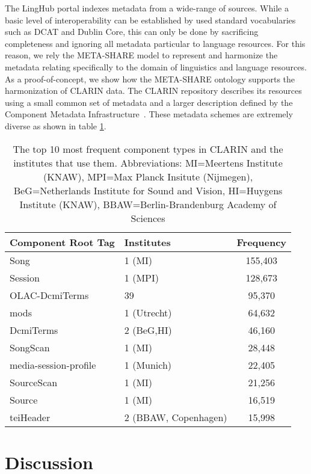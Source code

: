 \documentclass{llncs}
\begin{document}
{The LingHub portal indexes metadata from a wide-range of sources. While a basic level of interoperability can be established by used standard vocabularies such as DCAT and Dublin Core, this can only be done by sacrificing completeness and ignoring all metadata particular to language resources. For this reason, we rely the META-SHARE model to represent and harmonize the metadata relating specifically to the domain of linguistics and language resources. As a proof-of-concept, we show how the META-SHARE ontology supports the harmonization of CLARIN data. The
CLARIN repository describes its resources using a small common set of metadata
and a larger description defined by the Component Metadata
Infrastructure~\cite[CMDI]{broeder2012cmdi}. These metadata schemes are
extremely diverse as shown in table \ref{tab:clarin-types}.
\begin{table}
\begin{center}
\begin{tabular}{l|lc}
Component Root Tag & Institutes & Frequency \\
\hline
Song & 1 (MI) & 155,403 \\
Session & 1 (MPI) & 128,673 \\
OLAC-DcmiTerms & 39 & 95,370 \\
mods & 1 (Utrecht)& 64,632 \\
DcmiTerms & 2 (BeG,HI) & 46,160 \\
SongScan & 1 (MI) & 28,448 \\
media-session-profile & 1 (Munich) & 22,405 \\
SourceScan & 1 (MI) & 21,256 \\
Source & 1 (MI) & 16,519 \\
teiHeader & 2 (BBAW, Copenhagen) & 15,998 \\
\end{tabular}
\end{center}
\caption{\label{tab:clarin-types}The top 10 most frequent component types in
CLARIN and the institutes that use them. Abbreviations: MI=Meertens Institute (KNAW),
MPI=Max Planck Insitute (Nijmegen), BeG=Netherlands Institute for Sound and Vision,
HI=Huygens Institute (KNAW), BBAW=Berlin-Brandenburg Academy of Sciences}
\end{table}
\section{Discussion}
\label{sec:discussion}
}
\end{document}
